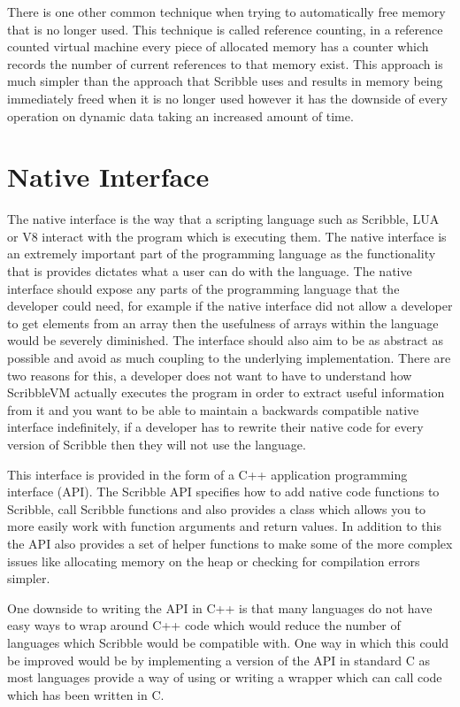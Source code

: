 \documentclass[]{final_report}
\begin{document}
There is one other common technique when trying to automatically free memory that is no longer used. This technique is called reference counting, in a reference counted virtual machine every piece of allocated memory has a counter which records the number of current references to that memory exist. This approach is much simpler than the approach that Scribble uses and results in memory being immediately freed when it is no longer used however it has the downside of every operation on dynamic data taking an increased amount of time.

\chapter{Native Interface}

The native interface is the way that a scripting language such as Scribble, LUA or V8 interact with the program which is executing them. The native interface is an extremely important part of the programming language as the functionality that is provides dictates what a user can do with the language. The native interface should expose any parts of the programming language that the developer could need, for example if the native interface did not allow a developer to get elements from an array then the usefulness of arrays within the language would be severely diminished. The interface should also aim to be as abstract as possible and avoid as much coupling to the underlying implementation. There are two reasons for this, a developer does not want to have to understand how ScribbleVM actually executes the program in order to extract useful information from it and you want to be able to maintain a backwards compatible native interface indefinitely, if a developer has to rewrite their native code for every version of Scribble then they will not use the language.

This interface is provided in the form of a C++ application programming interface (API). The Scribble API specifies how to add native code functions to Scribble, call Scribble functions and also provides a class which allows you to more easily work with function arguments and return values. In addition to this the API also provides a set of helper functions to make some of the more complex issues like allocating memory on the heap or checking for compilation errors simpler.

One downside to writing the API in C++ is that many languages do not have easy ways to wrap around C++ code which would reduce the number of languages which Scribble would be compatible with. One way in which this could be improved would be by implementing a version of the API in standard C as most languages provide a way of using or writing a wrapper which can call code which has been written in C.
\end{document}
